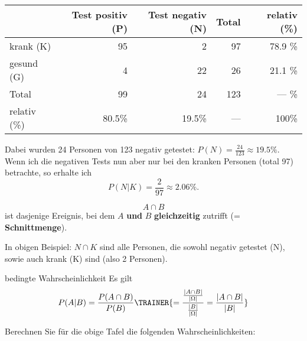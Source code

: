   \begin{tabular}{|l|r|r|r|r|}\hline
                 & Test positiv (P) & Test negativ (N)& Total & relativ (\%) \\\hline
    krank (K)    & 95               & 2               & 97    & 78.9 \%      \\\hline    
    gesund (G)   & 4                & 22              & 26    & 21.1 \%      \\\hline
    Total        & 99               & 24              & 123   &  --- \%      \\\hline
    relativ (\%) & 80.5\%           &19.5\%           & ---   &   100\%      \\\hline
  \end{tabular}
  
Dabei wurden 24 Personen von 123 negativ getestet: $P(N) =
\frac{24}{123}\approx 19.5\%$.
Wenn ich die negativen Tests nun aber nur bei den kranken Personen
(total 97) betrachte, so erhalte ich
$$P(N|K) = \frac{2}{97} \approx 2.06\%.$$

\begin{definition}{}{}
$$A\cap B$$ ist dasjenige Ereignis, bei dem $A$ \textbf{und} $B$
\textbf{gleichzeitig} zutrifft (= \textbf{Schnittmenge}).
\end{definition}

In obigen Beispiel: $N\cap K$ sind alle Personen, die sowohl negativ
getestet (N), sowie auch krank (K) sind (also 2 Personen).

\begin{gesetz}{bedingte Wahrscheinlichkeit}{}
  Es gilt
  $$P(A|B) = \frac{P(A\cap B)}{P(B)} \TRAINER{ = \frac{\frac{|A\cap B|}{|\Omega|}}{\frac{|B|}{|\Omega|}}= \frac{|A\cap B|}{|B|}}$$
  
\end{gesetz}

Berechnen Sie für die obige Tafel die folgenden Wahrscheinlichkeiten:

